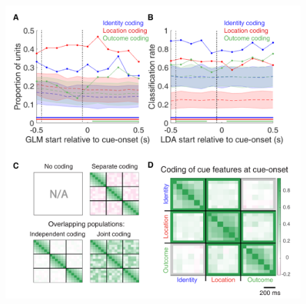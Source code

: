 \documentclass[11pt]{article}
\providecommand{\DIFaddbeginFL}{} %
\providecommand{\DIFdelendFL}{} %
\newcommand{\DIFaddincludegraphics}[2][]{{\color{red}\fbox{\DIFOincludegraphics[#1]{#2}}}} %
\DeclareRobustCommand{\DIFaddbeginFL}{\DIFOaddbeginFL \let\includegraphics\DIFaddincludegraphics} %
\DeclareRobustCommand{\DIFdelendFL}{\DIFOaddendFL \let\includegraphics\DIFOincludegraphics} %
\begin{document}
\begin{figure}[ht!]
\DIFdelendFL \DIFaddbeginFL \includegraphics[height=0.5\textheight]{Fig 4 - Q1.pdf}

\end{figure}
\end{document}
